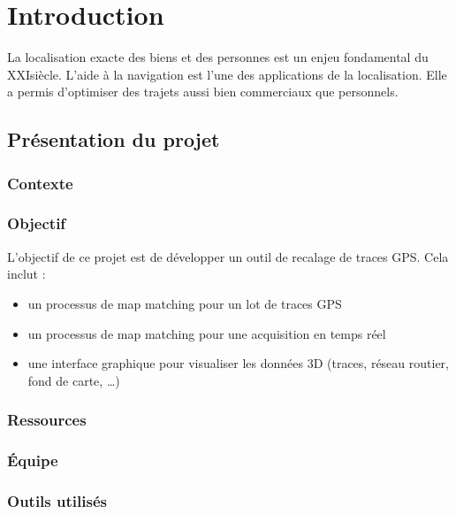 \chapter{Introduction}
La localisation exacte des biens et des personnes est un enjeu fondamental du XXI\ieme siècle. L'aide à la navigation est l'une des applications de la localisation. Elle a permis d'optimiser des trajets aussi bien commerciaux que personnels.
\section{Présentation du projet}
\subsection{Contexte}

\subsection{Objectif}
L'objectif de ce projet est de développer un outil de recalage de traces GPS. Cela inclut :
\begin{itemize}
\item{} un processus de map matching pour un lot de traces GPS
\item{} un processus de map matching pour une acquisition en temps réel
\item{} une interface graphique pour visualiser les données 3D (traces, réseau routier, fond de carte, \dots)
\end{itemize}
\subsection{Ressources}

\subsection{\'Equipe}
\subsection{Outils utilisés}